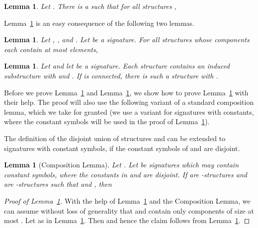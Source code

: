 \documentclass[11pt]{article}
\newtheorem{lemma}[theorem]{Lemma}
\begin{document}
\begin{lemma}
  \label{lem:msocut}
  Let . There is a  such that
  for all structures ,
  
\end{lemma}

Lemma~\ref{lem:msocut} is an easy consequence of the following two lemmas.

\begin{lemma}
  \label{lem:mso-cut-bounded-size}
  Let , , and . Let  be a
  signature. For all structures  whose
  components each contain at most  elements,
  
\end{lemma}

\begin{lemma}
  \label{lem:component-bound}
  Let  and let  be a signature. Each structure
   contains an induced substructure  with
   and . If  is
  connected, there is such a structure  with .
\end{lemma}

Before we prove Lemma~\ref{lem:mso-cut-bounded-size} and
Lemma~\ref{lem:component-bound}, we show how to prove Lemma~\ref{lem:msocut}
with their help. The proof will also use the following variant of a standard
composition lemma, which we take for granted (we use a variant for signatures
with constants, where the constant symbols will be used in the proof of
Lemma~\ref{lem:mso-cut-bounded-size}).

The definition of the disjoint union  of structures  and
 can be extended to signatures with constant symbols, if the constant
symbols of  and  are disjoint.

\begin{lemma}[Composition Lemma]
  Let . Let  be signatures which may
  contain constant symbols, where the constants in  and
   are disjoint. If  are -structures
  and  are -structures such that
   and , then
  
\end{lemma}

\begin{proof}[Proof of Lemma~\ref{lem:msocut}]
  With the help of Lemma~\ref{lem:component-bound} and the Composition
  Lemma, we can assume without loss of generality that  and 
  contain only components of size at most . Let
   as in Lemma~\ref{lem:mso-cut-bounded-size}. Then  and hence the claim follows from
  Lemma~\ref{lem:mso-cut-bounded-size}.
\end{proof}
\end{document}
